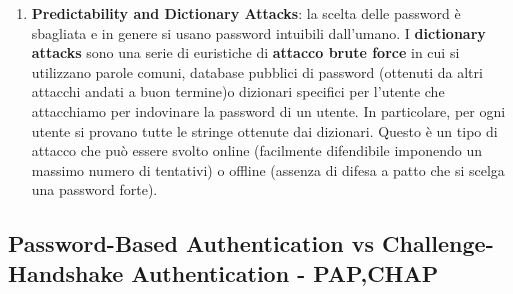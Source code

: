 \documentclass{article}
\newtheorem{definition}{Definition}[section]
\theoremstyle{remark}
\newtheorem*{remark}{\textbf{Remark}}
\begin{document}
\begin{enumerate}
\begin{remark}
\begin{itemize}
\begin{equation*}
			            \end{equation*}
			            Nel caso di giorni e mesi:\begin{equation*}
				            H(x)=-log_2(\frac{1}{366})366\frac{1}{366}=9 bit
			            \end{equation*}
		      \end{itemize}
		      \emph{\textbf{Altri Esempi Si trovano sui fogli}}
	      \end{remark}
	      Riassumendo, il \textbf{valore informativo} di $x_i$ dipende da quanto l'evento $x_i$ è inatteso: minore è la proabilità $p_i$, maggiore è il valore informativo di quell'evento.
	      \begin{definition}[Information Content]
		      \begin{equation*}
			      Information\ content = funzione\ di\ \frac{1}{p_i}
		      \end{equation*}
	      \end{definition}
	      \begin{definition}[Entropia]
		      L'\textbf{entropia} è il valor medio dell'\textbf{information content}.\begin{equation*}
			      H(X)=E[IC(X)]=\sum_ip_iIC_i=-\sum_ip_ilog_2(p_i)
		      \end{equation*}
	      \end{definition}
	      \begin{center}
		      \texttt{[image: entropy.png]}
	      \end{center}
	\item \textbf{Predictability and Dictionary Attacks}: la scelta delle password è sbagliata e in genere si usano password intuibili dall'umano. I \textbf{dictionary attacks} sono una serie di euristiche di \textbf{attacco brute force} in cui si utilizzano parole comuni, database pubblici di password (ottenuti da altri attacchi andati a buon termine)o dizionari specifici per l'utente che attacchiamo per indovinare la password di un utente. In particolare, per ogni utente si provano tutte le stringe ottenute dai dizionari. Questo è un tipo di attacco che può essere svolto online (facilmente difendibile imponendo un massimo numero di tentativi) o offline (assenza di difesa a patto che si scelga una password forte).
\end{enumerate}
\subsection{Password-Based Authentication vs Challenge-Handshake Authentication - PAP,CHAP}
\end{document}
